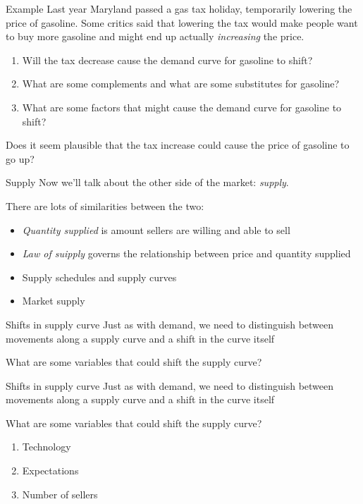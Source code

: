 \documentclass[aspectratio=169]{beamer}
\begin{document}
\begin{frame}{Example}
    Last year Maryland passed a gas tax holiday, temporarily lowering the price of gasoline. Some critics said that lowering the tax would make people want to buy more gasoline and might end up actually \textit{increasing} the price.

    \begin{enumerate}
        \item Will the tax decrease cause the demand curve for gasoline to shift?
        \item What are some complements and what are some substitutes for gasoline?
        \item What are some factors that might cause the demand curve for gasoline to shift?
    \end{enumerate}

    Does it seem plausible that the tax increase could cause the price of gasoline to go up?

  \end{frame}

  \begin{frame}{Supply}
    Now we'll talk about the other side of the market: \textit{supply}.

    \medskip

    There are lots of similarities between the two:
    \begin{itemize}
        \item \textit{Quantity supplied} is amount sellers are willing and able to sell
        \item \textit{Law of suipply} governs the relationship between price and quantity supplied
        \item Supply schedules and supply curves
        \item Market supply
    \end{itemize}
\end{frame}

\begin{frame}{Shifts in supply curve}
   Just as with demand, we need to distinguish between movements along a supply curve and a shift in the curve itself

   \medskip

   What are some variables that could shift the supply curve?
\end{frame}

\begin{frame}{Shifts in supply curve}
    Just as with demand, we need to distinguish between movements along a supply curve and a shift in the curve itself

   \medskip
   
   What are some variables that could shift the supply curve?
    
    \begin{enumerate}
        \item Technology
        \item Expectations
        \item Number of sellers
    \end{enumerate}
 \end{frame}
\end{document}
